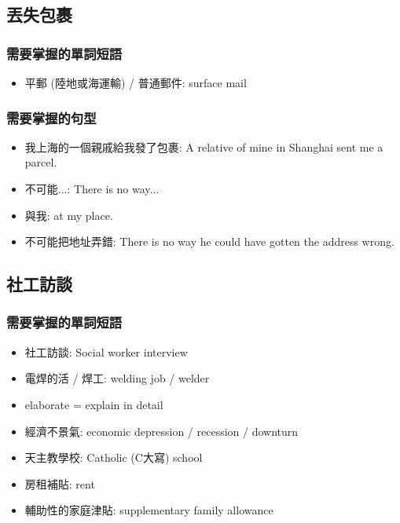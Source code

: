 \subsection{丟失包裹}
\subsubsection*{需要掌握的單詞短語}
\begin{itemize}
  \itemsep0em
  \item 平郵 (陸地或海運輸) / 普通郵件: surface mail
\end{itemize}

\subsubsection*{需要掌握的句型}
\begin{itemize}
  \itemsep0em
  \item 我上海的一個親戚給我發了包裹: A relative of mine in Shanghai sent me a parcel.
  \item 不可能...: There is no way...
  \item 與我:  at my place.
  \item 不可能把地址弄錯: There is no way he could have gotten the address wrong.
\end{itemize}

\subsection{社工訪談}
\subsubsection*{需要掌握的單詞短語}
\begin{itemize}
  \itemsep0em
  \item 社工訪談: Social worker interview
  \item 電焊的活 / 焊工: welding job / welder
  \item elaborate = explain in detail
  \item 經濟不景氣: economic depression / recession / downturn
  \item 天主教學校: Catholic (C大寫) school
  \item 房租補貼: rent 
  \item 輔助性的家庭津貼: supplementary family allowance
\end{itemize}


